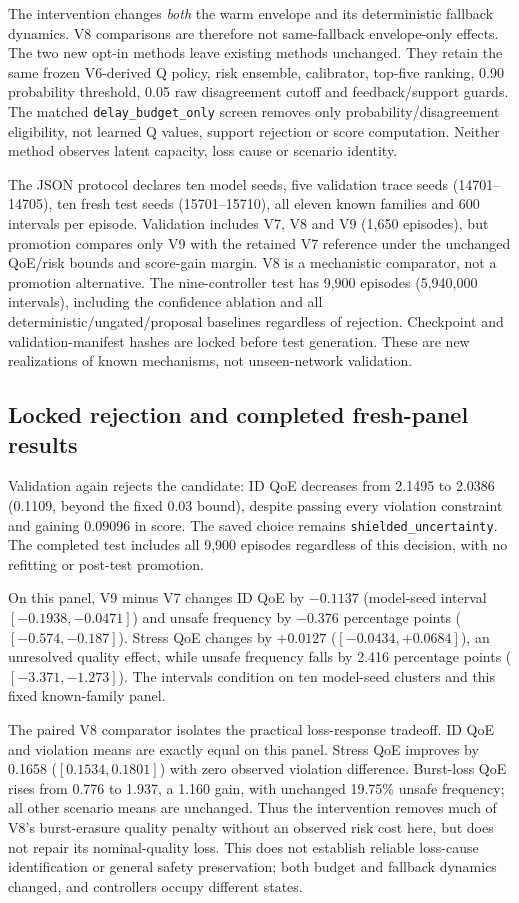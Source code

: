 \documentclass[10pt]{article}
\begin{document}
The intervention changes \emph{both} the warm envelope and its deterministic fallback dynamics. V8 comparisons are therefore not same-fallback envelope-only effects. The two new opt-in methods leave existing methods unchanged. They retain the same frozen V6-derived Q policy, risk ensemble, calibrator, top-five ranking, 0.90 probability threshold, 0.05 raw disagreement cutoff and feedback/support guards. The matched \texttt{delay\_budget\_only} screen removes only probability/disagreement eligibility, not learned Q values, support rejection or score computation. Neither method observes latent capacity, loss cause or scenario identity.

The JSON protocol declares ten model seeds, five validation trace seeds (14701--14705), ten fresh test seeds (15701--15710), all eleven known families and 600 intervals per episode. Validation includes V7, V8 and V9 (1,650 episodes), but promotion compares only V9 with the retained V7 reference under the unchanged QoE/risk bounds and score-gain margin. V8 is a mechanistic comparator, not a promotion alternative. The nine-controller test has 9,900 episodes (5,940,000 intervals), including the confidence ablation and all deterministic/ungated/proposal baselines regardless of rejection. Checkpoint and validation-manifest hashes are locked before test generation. These are new realizations of known mechanisms, not unseen-network validation.

\subsection{Locked rejection and completed fresh-panel results}
Validation again rejects the candidate: ID QoE decreases from 2.1495 to 2.0386 (0.1109, beyond the fixed 0.03 bound), despite passing every violation constraint and gaining 0.09096 in score. The saved choice remains \texttt{shielded\_uncertainty}. The completed test includes all 9,900 episodes regardless of this decision, with no refitting or post-test promotion.

On this panel, V9 minus V7 changes ID QoE by $-0.1137$ (model-seed interval $[-0.1938,-0.0471]$) and unsafe frequency by $-0.376$ percentage points ($[-0.574,-0.187]$). Stress QoE changes by $+0.0127$ ($[-0.0434,+0.0684]$), an unresolved quality effect, while unsafe frequency falls by 2.416 percentage points ($[-3.371,-1.273]$). The intervals condition on ten model-seed clusters and this fixed known-family panel.

The paired V8 comparator isolates the practical loss-response tradeoff. ID QoE and violation means are exactly equal on this panel. Stress QoE improves by 0.1658 ($[0.1534,0.1801]$) with zero observed violation difference. Burst-loss QoE rises from 0.776 to 1.937, a 1.160 gain, with unchanged 19.75\% unsafe frequency; all other scenario means are unchanged. Thus the intervention removes much of V8's burst-erasure quality penalty without an observed risk cost here, but does not repair its nominal-quality loss. This does not establish reliable loss-cause identification or general safety preservation; both budget and fallback dynamics changed, and controllers occupy different states.
\end{document}
